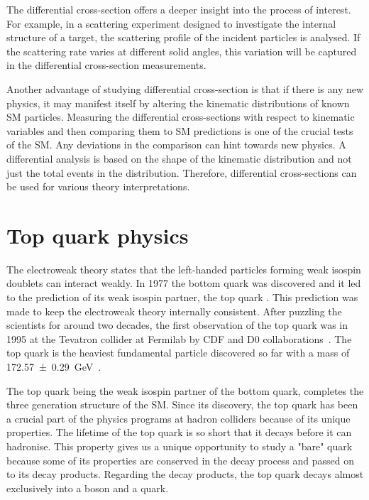 The differential cross-section offers a deeper insight into the process of interest. For example, in a 
scattering experiment designed to investigate the internal structure of a target, the scattering 
profile of the incident particles is analysed. If the scattering rate varies at different solid angles,
 this variation will be captured in the differential cross-section measurements. 

Another advantage of studying differential cross-section is that if there is any new physics,
it may manifest itself by altering the kinematic distributions of known SM particles. Measuring the 
differential cross-sections with respect to kinematic variables and then comparing them to SM predictions
is one of the crucial tests of the SM. Any deviations in the comparison can hint towards new physics.
A differential analysis is based on the shape of the kinematic distribution and not just the 
total events in the distribution. Therefore, differential cross-sections can be used for various
theory interpretations.

\section{Top quark physics}
The electroweak theory states that the left-handed particles forming weak isospin doublets can
interact weakly. In 1977 the bottom quark was discovered and it led to the prediction of its weak 
isospin partner, the top quark \Ptop. This prediction was made to keep the electroweak theory internally
consistent. After puzzling the scientists for around two decades,
the first observation of the top quark was in 1995 at the Tevatron collider at Fermilab by
CDF and D0 collaborations~\cite{PhysRevLett.74.2626,PhysRevLett.74.2632}.
The top quark is the heaviest fundamental particle discovered so far with a mass of 
\SI{172.57 \pm 0.29}{\GeV}~\cite{ParticleDataGroup:2024cfk}.

The top quark being the weak isospin partner of the bottom quark, completes the three 
generation structure of the SM. Since its discovery, the top quark has been a crucial part of
the physics programs at hadron colliders because of its unique properties. The lifetime of the top quark
is so short that it decays before it can hadronise. This property gives us a unique opportunity 
to study a "bare" quark because some of its properties are conserved in the decay process and 
passed on to its decay products. Regarding the decay products, the top quark decays almost exclusively
into a \PW boson and a \Pbottom quark. 

